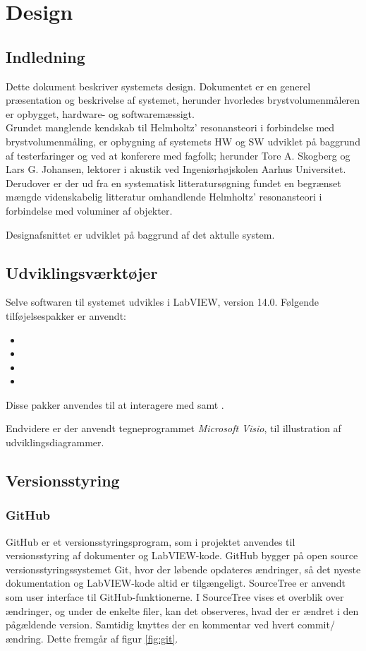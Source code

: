 
\chapter{Design}
\section{Indledning}
Dette dokument beskriver systemets design. Dokumentet er en generel præsentation og beskrivelse af systemet, herunder hvorledes brystvolumenmåleren er opbygget, hardware-  og softwaremæssigt. \\
Grundet manglende kendskab til Helmholtz' resonansteori i forbindelse med brystvolumenmåling, er opbygning af systemets HW og SW udviklet på baggrund af testerfaringer og ved at konferere med fagfolk; herunder Tore A. Skogberg og Lars G. Johansen, lektorer i akustik ved Ingeniørhøjskolen Aarhus Universitet. Derudover er der ud fra en systematisk litteratursøgning fundet en begrænset mængde videnskabelig litteratur omhandlende Helmholtz' resonansteori i forbindelse med voluminer af objekter.

Designafsnittet er udviklet på baggrund af det aktulle system. 

\section{Udviklingsværktøjer}
Selve softwaren til systemet udvikles i LabVIEW, version 14.0. Følgende tilføjelsespakker er anvendt:
\begin{itemize}
\item \visa
\item \vi
\item \ardsw	
\item \daqsoft 
\end{itemize}

Disse pakker anvendes til at interagere med \arduino{} samt \daq. 

Endvidere er der anvendt tegneprogrammet \textit{Microsoft Visio}, til illustration af udviklingsdiagrammer. 
	
\section{Versionsstyring}
\subsection{GitHub}
GitHub er et versionsstyringsprogram, som i projektet anvendes til versionsstyring af dokumenter og LabVIEW-kode. GitHub
bygger på open source versionsstyringssystemet Git, hvor der løbende opdateres ændringer, så det nyeste dokumentation og LabVIEW-kode altid er tilgængeligt. SourceTree er anvendt som user interface til GitHub-funktionerne. I SourceTree vises et overblik over ændringer, og under de enkelte filer, kan det observeres, hvad der er ændret i den pågældende version. Samtidig knyttes der en kommentar ved hvert commit/ ændring. Dette fremgår af figur \ref{fig:git}. 

